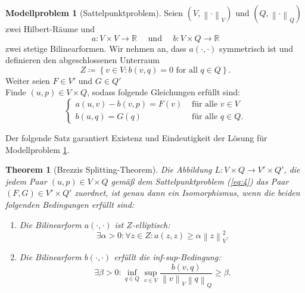 \message{ !name(script.tex)}\documentclass[a4paper]{scrartcl}
\newcommand{\real}{\mathbb{R}}
\newcommand{\vnorm}[1]{\left\lVert#1\right\rVert_V}
\newcommand{\norm}[1]{\left\lVert#1\right\rVert}
\theoremstyle{plain}
\newtheorem{theorem}{Theorem}
\theoremstyle{definition}
\newtheorem{modellproblem}{Modellproblem}
\theoremstyle{remark}
\begin{document}
\begin{modellproblem}[Sattelpunktproblem] \label{problem:2}
  Seien \((V,\vnorm{\cdot})\)  und \((Q,\norm{\cdot}_Q)\) zwei
  Hilbert-Räume und 
  \[a\colon V\times V \rightarrow \real 
  \quad \text{ und } \quad
  b\colon V\times Q \rightarrow \real\]
  zwei stetige Bilinearformen. Wir nehmen an, dass \(a(\cdot, \cdot)\) symmetrisch
  ist und definieren den abgeschlossenen Unterraum 
  \begin{equation}
    \label{eq:7}
    Z \coloneqq \left\{v \in V: b(v,q) = 0 \text{ for all } q\in Q\right\}.
  \end{equation}
  Weiter seien \(F \in V'\) und \(G \in Q'\)\\
  Finde \((u,p) \in V\times Q\), sodass folgende Gleichungen erfüllt
  sind: 
  \begin{equation}
    \label{eq:4}
    \begin{cases}
      a(u,v) - b(v,p) = F(v) & \text{ für alle } v \in V \\
      b(u,q) = G(q) & \text{ für alle } q \in Q.
    \end{cases}
  \end{equation}
\end{modellproblem}

\noindent Der folgende Satz garantiert Existenz und Eindeutigkeit der Lösung für
Modellproblem \ref{problem:2}. 

\begin{theorem}[Brezzis Splitting-Theorem] \label{thm:1}
  Die Abbildung \(L\colon V\times Q \rightarrow V' \times Q'\), die
  jedem Paar \((u,p) \in V\times Q\) gemäß dem Sattelpunktproblem
  (\ref{eq:4}) das Paar \((F,G) \in V'\times Q'\) zuordnet, ist genau
  dann ein Isomorphismus, wenn die beiden folgenden Bedingungen erfüllt
  sind: 
  \begin{enumerate}[label=(\roman*)]
  \item Die Bilinearform \(a(\cdot, \cdot)\) ist \(Z\)-elliptisch:
    \begin{equation}\label{eq:5}
      \exists \alpha > 0: \forall z \in Z: a(z,z) \geq \alpha \vnorm{z}^2.
    \end{equation}

  \item Die Bilinearform \(b(\cdot, \cdot)\) erfüllt die
    inf-sup-Bedingung: 
    \begin{equation}
      \label{eq:6}
      \exists \beta > 0: \inf_{q\in Q} \sup_{v\in V} \frac{b(v,q)}{\vnorm{v}\norm{q}_Q} \geq \beta.
    \end{equation}
  \end{enumerate}
\end{theorem}
\end{document}
